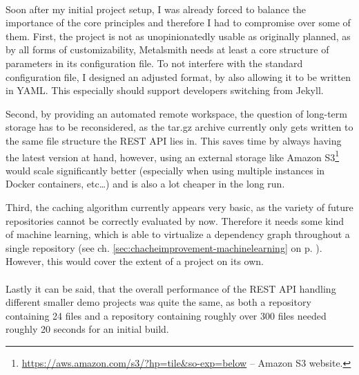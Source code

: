 \paragraph{}
Soon after my initial project setup, I was already forced to balance the importance of the core principles and therefore I had to compromise over some of them. First, the project is not as unopinionatedly usable as originally planned, as by all forms of customizability, Metalsmith needs at least a core structure of parameters in its configuration file. To not interfere with the standard configuration file, I designed an adjusted format, by also allowing it to be written in YAML. This especially should support developers switching from Jekyll.

Second, by providing an automated remote workspace, the question of long-term storage has to be reconsidered, as the tar.gz archive currently only gets written to the same file structure the REST API lies in. This saves time by always having the latest version at hand, however, using an external storage like Amazon S3\footnote{\url{https://aws.amazon.com/s3/?hp=tile&so-exp=below} -- Amazon S3 website.} would scale significantly better (especially when using multiple instances in Docker containers, etc\ldots) and is also a lot cheaper in the long run.

Third, the caching algorithm currently appears very basic, as the variety of future repositories cannot be correctly evaluated by now. Therefore it needs some kind of machine learning, which is able to virtualize a dependency graph throughout a single repository (see ch. \ref{sec:chacheimprovement-machinelearning} on p. \pageref{sec:chacheimprovement-machinelearning}). However, this would cover the extent of a project on its own.

\paragraph{}
Lastly it can be said, that the overall performance of the REST API handling different smaller demo projects was quite the same, as both a repository containing 24 files and a repository containing roughly over 300 files needed roughly 20 seconds for an initial build.

